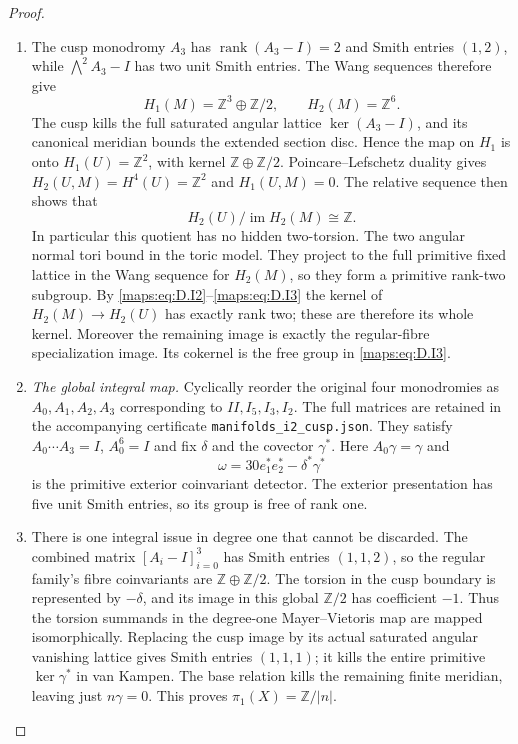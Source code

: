 \begin{proof}
\begin{enumerate}[label=\arabic*.,leftmargin=*]
\item The cusp monodromy $A_3$ has $\operatorname{rank}(A_3-I)=2$
and Smith entries $(1,2)$, while
$\bigwedge^2A_3-I$ has two unit Smith entries.
The Wang sequences therefore give
\[
 H_1(M)=\mathbb Z^3\oplus\mathbb Z/2,
 \qquad H_2(M)=\mathbb Z^6.
\]
The cusp kills the full saturated angular lattice
$\ker(A_3-I)$, and its canonical meridian bounds the
extended section disc. Hence the map on $H_1$ is onto
$H_1(U)=\mathbb Z^2$, with kernel
$\mathbb Z\oplus\mathbb Z/2$.
Poincare--Lefschetz duality gives
$H_2(U,M)=H^4(U)=\mathbb Z^2$ and $H_1(U,M)=0$.
The relative sequence then shows that
\[
 H_2(U)/\operatorname{im}H_2(M)\cong\mathbb Z.
 \tag{D.I3}\label{maps:eq:D.I3}
\]
In particular this quotient has no hidden two-torsion.
The two angular normal tori bound in the toric model.
They project to the full primitive fixed lattice in the
Wang sequence for $H_2(M)$, so they form a primitive
rank-two subgroup. By \eqref{maps:eq:D.I2}--\eqref{maps:eq:D.I3} the kernel of
$H_2(M)\to H_2(U)$ has exactly rank two; these are
therefore its whole kernel.
Moreover the remaining image is exactly the regular-fibre
specialization image. Its cokernel is the free group
in \eqref{maps:eq:D.I3}.

\item \emph{The global integral map.}
Cyclically reorder the original four monodromies as
$A_0,A_1,A_2,A_3$ corresponding to $II,I_5,I_3,I_2$.
The full matrices are retained in the accompanying certificate
\texttt{manifolds\_i2\_cusp.json}.
They satisfy $A_0\cdots A_3=I$, $A_0^6=I$ and
fix $\delta$ and the covector $\gamma^*$.
Here $A_0\gamma=\gamma$ and
\[
 \omega=30e_1^*e_2^*-\delta^*\gamma^*
\]
is the primitive exterior coinvariant detector.
The exterior presentation has five unit Smith entries,
so its group is free of rank one.

\item There is one integral issue in degree one that cannot be
discarded. The combined matrix $[A_i-I]_{i=0}^3$ has
Smith entries $(1,1,2)$, so the regular family's fibre
coinvariants are $\mathbb Z\oplus\mathbb Z/2$.
The torsion in the cusp boundary is represented by
$-\delta$, and its image in this global $\mathbb Z/2$
has coefficient $-1$. Thus the torsion summands in
the degree-one Mayer--Vietoris map are mapped
isomorphically. Replacing the cusp image by its actual
saturated angular vanishing lattice gives Smith entries
$(1,1,1)$; it kills the entire primitive
$\ker\gamma^*$ in van Kampen. The base relation kills
the remaining finite meridian, leaving just
$n\gamma=0$. This proves $\pi_1(X)=\mathbb Z/|n|$.


\end{enumerate}
\end{proof}
